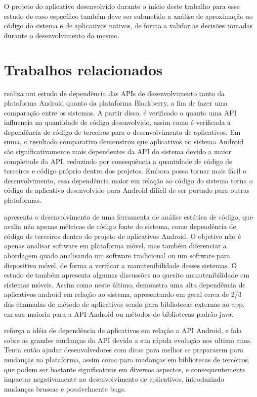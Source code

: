 O projeto do aplicativo desenvolvido durante o início deste trabalho para esse estudo de caso específico também deve ser submetido a análise de aproximação ao código do sistema e de aplicativos nativos, de forma a validar as decisões tomadas durante o desenvolvimento do mesmo.

\section{Trabalhos relacionados}

  realiza um estudo de dependência das APIs de desenvolvimento tanto da plataforma Android quanto da plataforma Blackberry, a fim de fazer uma comparação entre os sistemas. A partir disso, é verificado o quanto uma API influencia na quantidade de código desenvolvido, assim como é verificada a dependência de código de terceiros para o desenvolvimento de aplicativos. Em suma, o resultado comparativo demonstrou que aplicativos no sistema Android são significativamente mais dependentes da API do sistema devido a maior completude da API, reduzindo por consequência a quantidade de código de terceiros e código próprio dentro dos projetos. Embora possa tornar mais fácil o desenvolvimento, essa dependência maior em relação ao código do sistema torna o código de aplicativo desenvolvido para Android difícil de ser portado para outras plataformas.

 apresenta o desenvolvimento de uma ferramenta de análise estática de código, que avalia não apenas métricas de código fonte do sistema, como dependência de código de terceiros dentro do projeto de aplicativos Android. O objetivo não é apenas analisar software em plataforma móvel, mas também diferenciar a abordagem quado analisando um software tradicional ou um software para dispositivo móvel, de forma a verificar a manutenibilidade desses sistemas. O estudo de  também apresenta algumas discussões no quesito manutenibilidade em sistemas móveis. Assim como neste último,  demonstra uma alta dependência de aplicativos android em relação ao sistema, apresentando em geral cerca de  2/3 das chamadas de método de aplicativos sendo para bibliotecas externas ao app, em sua maioria para a API Android ou métodos de bibliotecas padrão java.

 reforça a idéia de dependência de aplicativos em relação a API Android, e fala sobre as grandes mudanças da API devido a sua rápida evolução nos ultimo anos. Tenta então ajudar desenvolvedores com dicas para melhor se prepararem para mudanças na plataforma, assim como para mudanças em bibliotecas de terceiros, que podem ser bastante significativas em diversos aspectos, e consequentemente impactar negativamente no desenvolvimento de aplicativos, introduzindo mudanças bruscas e possivelmente bugs.

